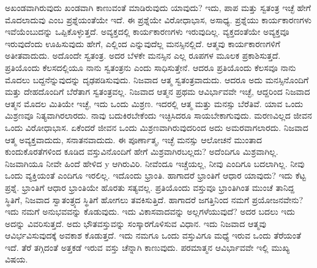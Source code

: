 ಅಖಂಡವಾಗಿರುವುದು ಖಂಡವಾಗಿ ಕಾಣುವಂತೆ ಮಾಡಿರುವುದು ಯಾವುದು? ಇದು, ಪಾಪ ಮತ್ತು ಸ್ವತಂತ್ರ ಇಚ್ಛೆ ಹೇಗೆ ಮೊದಲಾದುವು ಎಂಬ ಪ್ರಶ್ನೆಯಂತೆಯೇ ಇದೆ. ಈ ಪ್ರಶ್ನೆಯೇ ವಿರೋಧಾಭಾಸ, ಅಸಾಧ್ಯ. ಪ್ರಶ್ನೆಯು ಕಾರ್ಯಕಾರಣಗಳು ಇವೆಯೆಂಬುದನ್ನು ಒಪ್ಪಿಕೊಳ್ಳುತ್ತದೆ. ಅವ್ಯಕ್ತದಲ್ಲಿ ಕಾರ್ಯಕಾರಣಗಳು ಇರುವುದಿಲ್ಲ. ವ್ಯಕ್ತದಂತೆಯೇ ಅವ್ಯಕ್ತವೂ ಇರುವುದೆಂದು ಊಹಿಸುವುದು ಹೇಗೆ, ಎಲ್ಲಿಂದ ಎನ್ನುವುದೆಲ್ಲ ಮನಸ್ಸಿನಲ್ಲಿದೆ. ಆತ್ಮವು ಕಾರ್ಯಕಾರಣಗಳಿಗೆ ಅತೀತವಾದುದು. ಅದೊಂದೇ ಸ್ವತಂತ್ರ. ಅದರ ಬೆಳಕೇ ಮನಸ್ಸಿನ ಎಲ್ಲ ರೂಪಗಳ ಮೂಲಕ ಪ್ರಕಾಶಿಸುತ್ತದೆ. ಪ್ರತಿಯೊಂದು ಕೆಲಸದಲ್ಲಿಯೂ ನಾನು ಸ್ವತಂತ್ರನು ಎಂದು ಸಾಧಿಸುತ್ತೇನೆ. ಆದರೂ ಪ್ರತಿಯೊಂದು ಕೆಲಸವೂ ನಾನು ಮೊದಲು ಬದ್ದನೆನ್ನುವುದನ್ನು ದೃಢಪಡಿಸುವುದು. ನಿಜವಾದ ಆತ್ಮ ಸ್ವತಂತ್ರವಾದುದು. ಆದರೂ ಅದು ಮನಸ್ಸಿನೊಂದಿಗೆ ಮತ್ತು ದೇಹದೊಂದಿಗೆ ಬೆರೆತಾಗ ಸ್ವತಂತ್ರವಲ್ಲ. ನಿಜವಾದ ಆತ್ಮನ ಪ್ರಥಮ ಆವಿರ್ಭಾವವೇ ಇಚ್ಛೆ, ಆದ್ದರಿಂದ ನಿಜವಾದ ಆತ್ಮನ ಮೊದಲ ಮಿತಿಯೇ ಇಚ್ಛೆ, ಇದು ಒಂದು ಮಿಶ್ರಣ. ಇದರಲ್ಲಿ ಆತ್ಮ ಮತ್ತು ಮನಸ್ಸು ಬೆರೆತಿವೆ. ಯಾವ ಒಂದು ಮಿಶ್ರಣವೂ ನಿತ್ಯವಾಗಿರಲಾರದು. ನಾವು ಬದುಕಿರಬೇಕೆಂದು ಇಚ್ಛಿಸಿದರೂ ಸಾಯಬೇಕಾಗುವುದು. ಮರಣವಿಲ್ಲದ ಜೀವನ ಒಂದು ವಿರೋಧಾಭಾಸ. ಏಕೆಂದರೆ ಜೀವನ ಒಂದು ಮಿಶ್ರಣವಾಗಿರುವುದರಿಂದ ಅದು ಅಮರವಾಗಲಾರದು. ನಿಜವಾದ ಆತ್ಮ ಅವ್ಯಕ್ತವಾದುದು, ಸನಾತನವಾದುದು. ಈ ಪೂರ್ಣಾತ್ಮ, ಇಚ್ಛೆ ಮನಸ್ಸು ಆಲೋಚನೆ ಮುಂತಾದ ಕುಂದುಕೊರತೆಗಳಿಂದ ಕೂಡಿದ ವಸ್ತುವಿನೊಂದಿಗೆ ಹೇಗೆ ಮಿಶ್ರವಾಗಿರಬಲ್ಲದು? ಅದೆಂದಿಗೂ ಮಿಶ್ರವಾಗಿಲ್ಲ. ನಿಜವಾಗಿಯೂ ನೀವೇ ಹಿಂದೆ ಹೇಳಿದ y ಆಗಿರುವಿರಿ. ನೀವೆಂದೂ ಇಚ್ಚೆಯಲ್ಲ, ನೀವು ಎಂದಿಗೂ ಬದಲಾಗಿಲ್ಲ. ನೀವು ಒಂದು ವ್ಯಕ್ತಿಯಂತೆ ಎಂದಿಗೂ ಇರಲಿಲ್ಲ. ಇದೊಂದು ಭ್ರಾಂತಿ. ಹಾಗಾದರೆ ಭ್ರಾಂತಿಗೆ ಆಧಾರ ಯಾವುದು? ಇದು ಕೆಟ್ಟ ಪ್ರಶ್ನೆ. ಭ್ರಾಂತಿಗೆ ಆಧಾರ ಭ್ರಾಂತಿಯೇ ಹೊರತು ಸತ್ಯವಲ್ಲ. ಪ್ರತಿಯೊಂದು ವಸ್ತುವೂ ಭ್ರಾಂತಿಗಿಂತ ಮುಂಚೆ ತಾನಿದ್ದ ಸ್ಥಿತಿಗೆ, ನಿಜವಾದ ಸ್ವಾತಂತ್ರ್ಯದ ಸ್ಥಿತಿಗೆ ಹೋಗಲು ತವಕಿಸುತ್ತಿದೆ. ಹಾಗಾದರೆ ಜಗತ್ತಿನಿಂದ ನಮಗೆ ಪ್ರಯೋಜನವೇನು? ಇದು ನಮಗೆ ಅನುಭವವನ್ನು ಕೊಡುವುದು. ಇದು ವಿಕಾಸವಾದವನ್ನು ಅಲ್ಲಗಳೆಯುವುದೆ? ಅದರ ಬದಲು ಇದು ಅದನ್ನು ವಿವರಿಸುತ್ತದೆ. ಅದು ಭೌತವಸ್ತುವನ್ನು ಸಂಸ್ಕಾರಗೊಳಿಸುವ ವಿಧಾನ. ಇದು ನಿಜವಾದ ಆತ್ಮವು ಆವಿರ್ಭವಿಸುವುದಕ್ಕೆ ಅವಕಾಶ ಕೊಡುತ್ತದೆ. ಇದು ನಮಗೂ ಒಂದು ವಸ್ತುವಿಗೂ ಮಧ್ಯೆ ಇರುವ ಒಂದು ತೆರೆಯಂತೆ ಇದೆ. ತೆರೆ ತಗ್ಗಿದಂತೆ ಅತ್ತಕಡೆ ಇರುವ ವಸ್ತು ಚೆನ್ನಾಗಿ ಕಾಣುವುದು. ಪರಮಾತ್ಮನ ಆವಿರ್ಭಾವವೇ ಇಲ್ಲಿ ಮುಖ್ಯ ವಿಷಯ.

